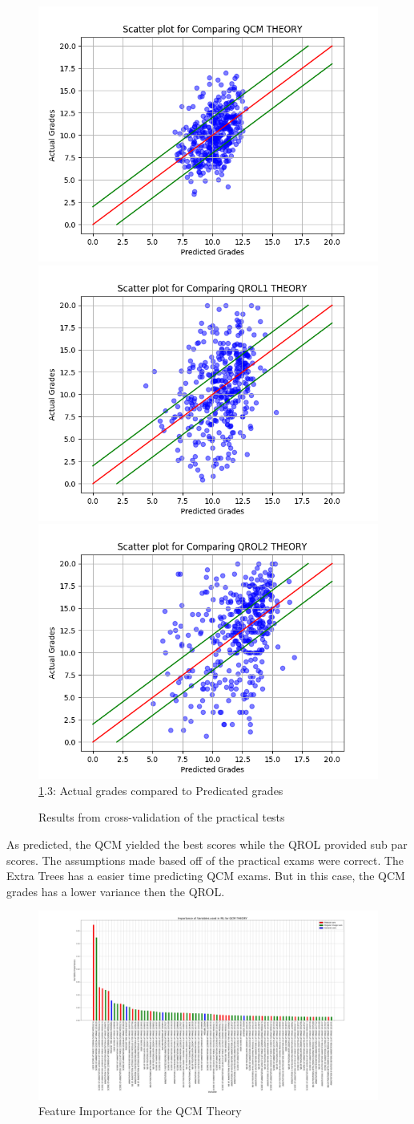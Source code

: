 \documentclass[a4paper,11pt]{report}
\numberwithin{figure}{section} %
\begin{document}
\begin{figure}[H]
      \includegraphics[width=.30\linewidth]{cv_comp_QCM_THEORY_2018-04-30_13_57_05.png}
      \includegraphics[width=.30\linewidth]{cv_comp_QROL1_THEORY_2018-04-30_13_40_50.png}
  	  \includegraphics[width=.30\linewidth]{cv_comp_QROL2_THEORY_2018-04-30_13_12_52.png}
      \\
      \ref{fig:results_theo}.3: Actual grades compared to Predicated grades
      \caption{Results from cross-validation of the practical tests}
      \label{fig:results_theo}
    \end{figure}
    
    As predicted, the QCM yielded the best scores while the QROL provided sub par scores. The assumptions made based off of the practical exams were correct. The Extra Trees has a easier time predicting QCM exams. But in this case, the QCM grades has a lower variance then the QROL.

     \begin{figure}[H]
      \centering
      \includegraphics[width=.95\linewidth]{var_importance_QCM_THEORY_2018-05-02_20_53_18.png}
      \caption{Feature Importance for the QCM Theory}
      \label{fig:var_th1}
      \end{figure}
      
\end{document}

